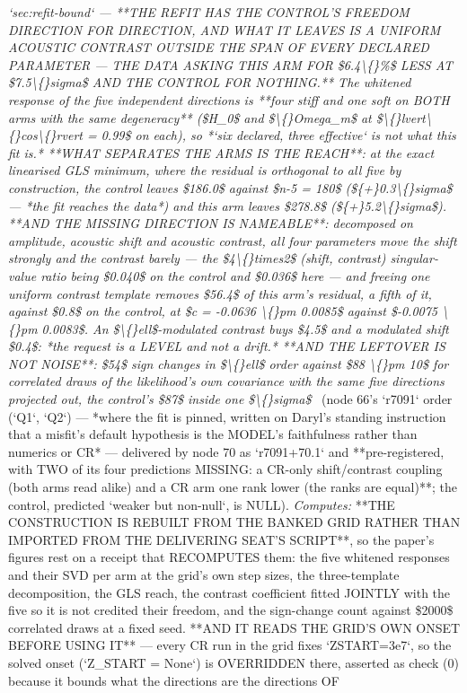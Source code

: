 \begin{description}
\textit{`sec:refit-bound` ---  **THE REFIT HAS THE CONTROL'S FREEDOM DIRECTION FOR DIRECTION, AND WHAT IT LEAVES IS A UNIFORM ACOUSTIC CONTRAST OUTSIDE THE SPAN OF EVERY DECLARED PARAMETER --- THE DATA ASKING THIS ARM FOR \$6.4\textbackslash\{\}\%\$ LESS AT \$7.5\textbackslash\{\}sigma\$ AND THE CONTROL FOR NOTHING.** The whitened response of the five independent directions is **four stiff and one soft on BOTH arms with the same degeneracy** (\$H\_0\$ and \$\textbackslash\{\}Omega\_m\$ at \$\textbackslash\{\}lvert\textbackslash\{\}cos\textbackslash\{\}rvert = 0.99\$ on each), so *`six declared, three effective` is not what this fit is.*  **WHAT SEPARATES THE ARMS IS THE REACH**: at the exact linearised GLS minimum, where the residual is orthogonal to all five by construction, the control leaves \$186.0\$ against \$n-5 = 180\$ (\$\{+\}0.3\textbackslash\{\}sigma\$ --- *the fit reaches the data*) and this arm leaves \$278.8\$ (\$\{+\}5.2\textbackslash\{\}sigma\$).  **AND THE MISSING DIRECTION IS NAMEABLE**: decomposed on amplitude, acoustic shift and acoustic contrast, all four parameters move the shift strongly and the contrast barely --- the \$4\textbackslash\{\}times2\$ (shift, contrast) singular-value ratio being \$0.040\$ on the control and \$0.036\$ here --- and freeing one uniform contrast template removes \$56.4\$ of this arm's residual, a fifth of it, against \$0.8\$ on the control, at \$c = -0.0636 \textbackslash\{\}pm 0.0085\$ against \$-0.0075 \textbackslash\{\}pm 0.0083\$. An \$\textbackslash\{\}ell\$-modulated contrast buys \$4.5\$ and a modulated shift \$0.4\$: *the request is a LEVEL and not a drift.*  **AND THE LEFTOVER IS NOT NOISE**: \$54\$ sign changes in \$\textbackslash\{\}ell\$ order against \$88 \textbackslash\{\}pm 10\$ for correlated draws of the likelihood's own covariance with the same five directions projected out, the control's \$87\$ inside one \$\textbackslash\{\}sigma\$} \ (node 66's `r7091` order (`Q1`, `Q2`) --- *where the fit is pinned, written on Daryl's standing instruction that a misfit's default hypothesis is the MODEL's faithfulness rather than numerics or CR* --- delivered by node 70 as `r7091+70.1` and **pre-registered, with TWO of its four predictions MISSING: a CR-only shift/contrast coupling (both arms read alike) and a CR arm one rank lower (the ranks are equal)**; the control, predicted `weaker but non-null`, is NULL). 
\emph{Computes:}  **THE CONSTRUCTION IS REBUILT FROM THE BANKED GRID RATHER THAN IMPORTED FROM THE DELIVERING SEAT'S SCRIPT**, so the paper's figures rest on a receipt that RECOMPUTES them: the five whitened responses and their SVD per arm at the grid's own step sizes, the three-template decomposition, the GLS reach, the contrast coefficient fitted JOINTLY with the five so it is not credited their freedom, and the sign-change count against \$2000\$ correlated draws at a fixed seed.  **AND IT READS THE GRID'S OWN ONSET BEFORE USING IT** --- every CR run in the grid fixes `ZSTART=3e7`, so the solved onset (`Z\_START = None`) is OVERRIDDEN there, asserted as check (0) because it bounds what the directions are the directions OF

\end{description}
